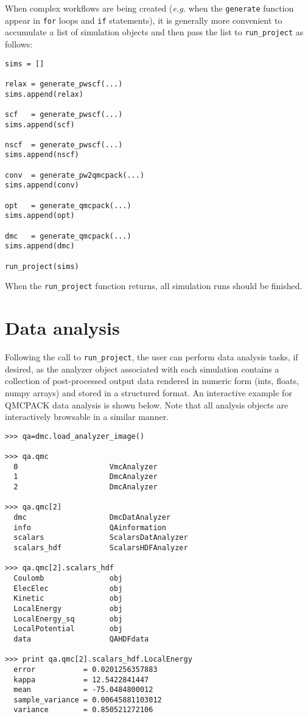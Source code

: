 \documentclass[oneside,11pt]{memoir}
\numberwithin{equation}{section}
\begin{document}
\noindent
When complex workflows are being created (\textit{e.g.} when the \texttt{generate} function appear in \texttt{for} loops and \texttt{if} statements), it is generally more convenient to accumulate a list of simulation objects and then pass the list to \texttt{run\_project} as follows:
\begin{verbatim}
sims = []

relax = generate_pwscf(...)
sims.append(relax)

scf   = generate_pwscf(...)
sims.append(scf)

nscf  = generate_pwscf(...)
sims.append(nscf)

conv  = generate_pw2qmcpack(...)
sims.append(conv)

opt   = generate_qmcpack(...)
sims.append(opt)

dmc   = generate_qmcpack(...)
sims.append(dmc)

run_project(sims)
\end{verbatim}

\noindent
When the \texttt{run\_project} function returns, all simulation runs should be finished.  


\section{Data analysis}\label{sec:user_data_analysis}
Following the call to \texttt{run\_project}, the user can perform data analysis tasks, if desired, as the analyzer object associated with each simulation contains a collection of post-processed output data rendered in numeric form (ints, floats, numpy arrays) and stored in a structured format.  An interactive example for QMCPACK data analysis is shown below.  Note that all analysis objects are interactively browsable in a similar manner.
\begin{shaded}
\begin{verbatim}
>>> qa=dmc.load_analyzer_image()

>>> qa.qmc
  0                     VmcAnalyzer
  1                     DmcAnalyzer
  2                     DmcAnalyzer

>>> qa.qmc[2]
  dmc                   DmcDatAnalyzer
  info                  QAinformation
  scalars               ScalarsDatAnalyzer
  scalars_hdf           ScalarsHDFAnalyzer

>>> qa.qmc[2].scalars_hdf
  Coulomb               obj
  ElecElec              obj
  Kinetic               obj
  LocalEnergy           obj
  LocalEnergy_sq        obj
  LocalPotential        obj
  data                  QAHDFdata

>>> print qa.qmc[2].scalars_hdf.LocalEnergy
  error           = 0.0201256357883
  kappa           = 12.5422841447
  mean            = -75.0484800012
  sample_variance = 0.00645881103012
  variance        = 0.850521272106
\end{verbatim}
\end{shaded}
\end{document}
